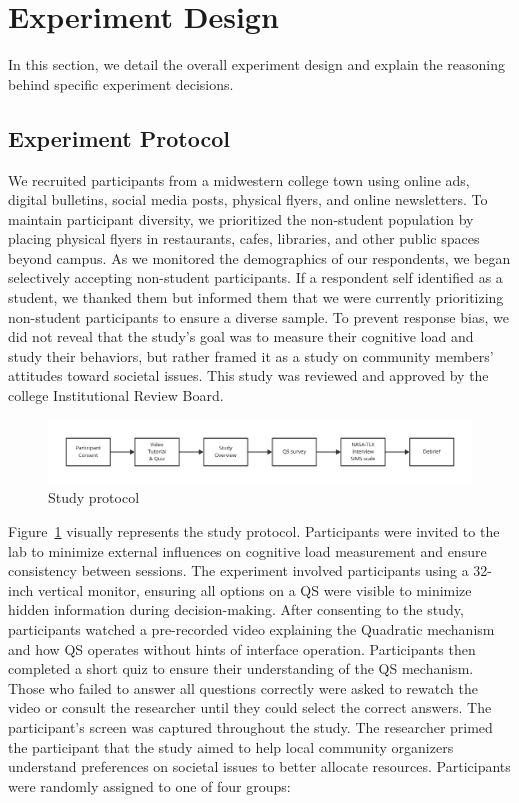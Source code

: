\section{Experiment Design}
\label{sec:experiment}
In this section, we detail the overall experiment design and explain the reasoning behind specific experiment decisions.

\subsection{Experiment Protocol}
We recruited participants from a midwestern college town using online ads, digital bulletins, social media posts, physical flyers, and online newsletters. To maintain participant diversity, we prioritized the non-student population by placing physical flyers in restaurants, cafes, libraries, and other public spaces beyond campus. As we monitored the demographics of our respondents, we began selectively accepting non-student participants. If a respondent self identified as a student, we thanked them but informed them that we were currently prioritizing non-student participants to ensure a diverse sample. 
To prevent response bias, we did not reveal that the study's goal was to measure their cognitive load and study their behaviors, but rather framed it as a study on community members' attitudes toward societal issues. This study was reviewed and approved by the college Institutional Review Board.

\begin{figure}[ht]
    \centering
    \includegraphics[width=1\textwidth]{content/image/study_flow.pdf}
    \caption{Study protocol}
    \label{fig:studyProtocol}
\end{figure}

Figure~\ref{fig:studyProtocol} visually represents the study protocol. Participants were invited to the lab to minimize external influences on cognitive load measurement and ensure consistency between sessions. The experiment involved participants using a 32-inch vertical monitor, ensuring all options on a QS were visible to minimize hidden information during decision-making. After consenting to the study, participants watched a pre-recorded video explaining the Quadratic mechanism and how QS operates without hints of interface operation. Participants then completed a short quiz to ensure their understanding of the QS mechanism. Those who failed to answer all questions correctly were asked to rewatch the video or consult the researcher until they could select the correct answers. The participant's screen was captured throughout the study. The researcher primed the participant that the study aimed to help local community organizers understand preferences on societal issues to better allocate resources. Participants were randomly assigned to one of four groups:

